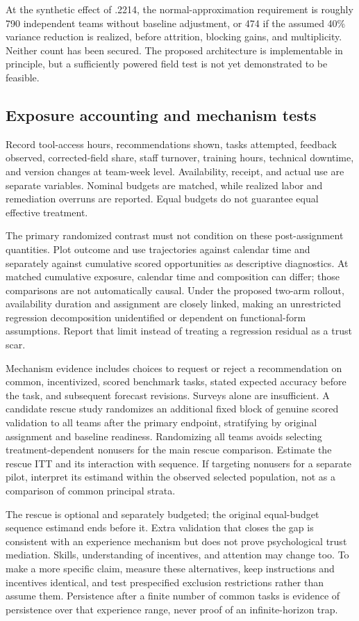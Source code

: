 \documentclass[11pt]{article}
\begin{document}
At the synthetic effect of .2214, the normal-approximation requirement is roughly 790 independent teams without baseline adjustment, or 474 if the assumed 40\% variance reduction is realized, before attrition, blocking gains, and multiplicity. Neither count has been secured. The proposed architecture is implementable in principle, but a sufficiently powered field test is not yet demonstrated to be feasible.

\subsection{Exposure accounting and mechanism tests}
Record tool-access hours, recommendations shown, tasks attempted, feedback observed, corrected-field share, staff turnover, training hours, technical downtime, and version changes at team-week level. Availability, receipt, and actual use are separate variables. Nominal budgets are matched, while realized labor and remediation overruns are reported. Equal budgets do not guarantee equal effective treatment.

The primary randomized contrast must not condition on these post-assignment quantities. Plot outcome and use trajectories against calendar time and separately against cumulative scored opportunities as descriptive diagnostics. At matched cumulative exposure, calendar time and composition can differ; those comparisons are not automatically causal. Under the proposed two-arm rollout, availability duration and assignment are closely linked, making an unrestricted regression decomposition unidentified or dependent on functional-form assumptions. Report that limit instead of treating a regression residual as a trust scar.

Mechanism evidence includes choices to request or reject a recommendation on common, incentivized, scored benchmark tasks, stated expected accuracy before the task, and subsequent forecast revisions. Surveys alone are insufficient. A candidate rescue study randomizes an additional fixed block of genuine scored validation to all teams after the primary endpoint, stratifying by original assignment and baseline readiness. Randomizing all teams avoids selecting treatment-dependent nonusers for the main rescue comparison. Estimate the rescue ITT and its interaction with sequence. If targeting nonusers for a separate pilot, interpret its estimand within the observed selected population, not as a comparison of common principal strata.

The rescue is optional and separately budgeted; the original equal-budget sequence estimand ends before it. Extra validation that closes the gap is consistent with an experience mechanism but does not prove psychological trust mediation. Skills, understanding of incentives, and attention may change too. To make a more specific claim, measure these alternatives, keep instructions and incentives identical, and test prespecified exclusion restrictions rather than assume them. Persistence after a finite number of common tasks is evidence of persistence over that experience range, never proof of an infinite-horizon trap.
\end{document}
